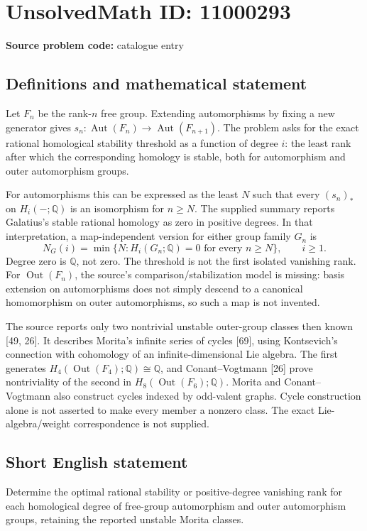 \documentclass[11pt]{article}
\newcommand{\Q}{\mathbb{Q}}
\begin{document}
\section*{UnsolvedMath ID: 11000293}
\textbf{Source problem code:} catalogue entry
\subsection{Definitions and mathematical statement}
Let \(F_n\) be the rank-\(n\) free group. Extending automorphisms by fixing a new generator gives \(s_n:\operatorname{Aut}(F_n)\to\operatorname{Aut}(F_{n+1})\). The problem asks for the exact rational homological stability threshold as a function of degree \(i\): the least rank after which the corresponding homology is stable, both for automorphism and outer automorphism groups.

For automorphisms this can be expressed as the least \(N\) such that every \((s_n)_*\) on \(H_i(-;\Q)\) is an isomorphism for \(n\geq N\). The supplied summary reports Galatius's stable rational homology as zero in positive degrees. In that interpretation, a map-independent version for either group family \(G_n\) is
\[
 N_G(i)=\min\{N:H_i(G_n;\Q)=0\text{ for every }n\geq N\},
 \qquad i\geq1.
\]
Degree zero is \(\Q\), not zero. The threshold is not the first isolated vanishing rank. For \(\operatorname{Out}(F_n)\), the source's comparison/stabilization model is missing: basis extension on automorphisms does not simply descend to a canonical homomorphism on outer automorphisms, so such a map is not invented.

The source reports only two nontrivial unstable outer-group classes then known [49, 26]. It describes Morita's infinite series of cycles [69], using Kontsevich's connection with cohomology of an infinite-dimensional Lie algebra. The first generates
\(H_4(\operatorname{Out}(F_4);\Q)\cong\Q\), and Conant--Vogtmann [26] prove nontriviality of the second in \(H_8(\operatorname{Out}(F_6);\Q)\). Morita and Conant--Vogtmann also construct cycles indexed by odd-valent graphs. Cycle construction alone is not asserted to make every member a nonzero class. The exact Lie-algebra/weight correspondence is not supplied.
\subsection{Short English statement}
Determine the optimal rational stability or positive-degree vanishing rank for each homological degree of free-group automorphism and outer automorphism groups, retaining the reported unstable Morita classes.
\end{document}
